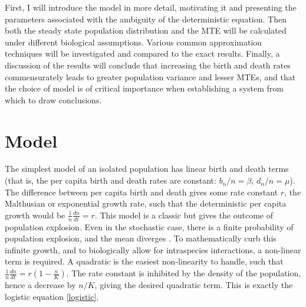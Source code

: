 First, I will introduce the model in more detail, motivating it and presenting the parameters associated with the ambiguity of the deterministic equation. 
Then both the steady state population distribution and the MTE will be calculated under different biological assumptions. 
Various common approximation techniques will be investigated and compared to the exact results. 
Finally, a discussion of the results will conclude that increasing the birth and death rates commensurately leads to greater population variance and lesser MTEs, and that the choice of model is of critical importance when establishing a system from which to draw conclusions. 



\section{Model}%

The simplest model of an isolated population has linear birth and death terms (that is, the per capita birth and death rates are constant: $b_n/n=\beta$, $d_n/n=\mu$). 
The difference between per capita birth and death gives some rate constant $r$, the Malthusian or exponential growth rate, such that the deterministic per capita growth would be $\frac{1}{n}\frac{dn}{dt} = r$. 
This model is a classic but gives the outcome of population explosion. 
Even in the stochastic case, there is a finite probability of population explosion, and the mean diverges \cite{Nisbet1982}. 
To mathematically curb this infinite growth, and to biologically allow for intraspecies interactions, a non-linear term is required. 
A quadratic is the easiest non-linearity to handle, such that $\frac{1}{n}\frac{dn}{dt} = r\left(1-\frac{n}{K}\right)$. 
The rate constant is inhibited by the density of the population, hence a decrease by $n/K$, giving the desired quadratic term. 
This is exactly the logistic equation \ref{logistic}. 

